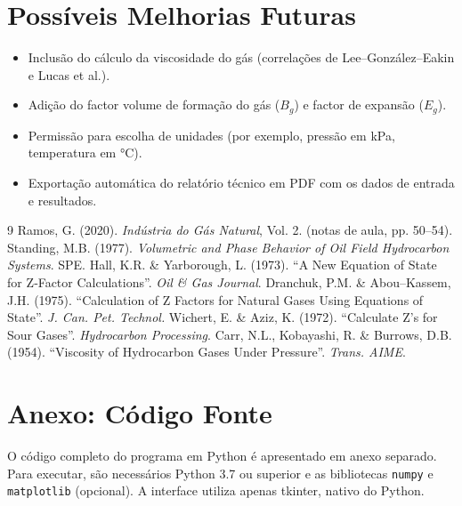 \documentclass[a4paper,12pt]{article}
\begin{document}
\section{Possíveis Melhorias Futuras}
\begin{itemize}
    \item Inclusão do cálculo da viscosidade do gás (correlações de Lee–González–Eakin e Lucas et al.).
    \item Adição do factor volume de formação do gás (\(B_g\)) e factor de expansão (\(E_g\)).
    \item Permissão para escolha de unidades (por exemplo, pressão em kPa, temperatura em °C).
    \item Exportação automática do relatório técnico em PDF com os dados de entrada e resultados.
\end{itemize}

\begin{thebibliography}{9}
     Ramos, G. (2020). \textit{Indústria do Gás Natural}, Vol. 2. (notas de aula, pp. 50–54).
     Standing, M.B. (1977). \textit{Volumetric and Phase Behavior of Oil Field Hydrocarbon Systems}. SPE.
     Hall, K.R. \& Yarborough, L. (1973). “A New Equation of State for Z‑Factor Calculations”. \textit{Oil \& Gas Journal}.
     Dranchuk, P.M. \& Abou–Kassem, J.H. (1975). “Calculation of Z Factors for Natural Gases Using Equations of State”. \textit{J. Can. Pet. Technol.}
     Wichert, E. \& Aziz, K. (1972). “Calculate Z’s for Sour Gases”. \textit{Hydrocarbon Processing}.
     Carr, N.L., Kobayashi, R. \& Burrows, D.B. (1954). “Viscosity of Hydrocarbon Gases Under Pressure”. \textit{Trans. AIME}.
\end{thebibliography}

\appendix
\section{Anexo: Código Fonte}
O código completo do programa em Python é apresentado em anexo separado. Para executar, são necessários Python 3.7 ou superior e as bibliotecas \texttt{numpy} e \texttt{matplotlib} (opcional). A interface utiliza apenas tkinter, nativo do Python.
\end{document}
